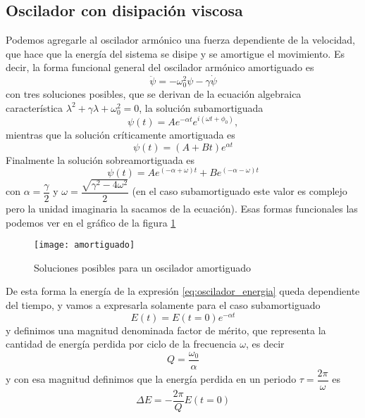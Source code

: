 \documentclass[a4paper]{article}
\numberwithin{equation}{section}
\begin{document}
    \subsection{Oscilador con disipación viscosa}
    Podemos agregarle al oscilador armónico una fuerza dependiente de la velocidad, que hace que la energía del sistema se disipe y se amortigue el movimiento. Es decir, la forma funcional general del oscilador armónico amortiguado es
    \begin{equation}
        \ddot{\psi} = - \omega_0^2 \psi - \gamma \dot{\psi}
        \label{eq:oscilador_amortiguado}
    \end{equation}
    con tres soluciones posibles, que se derivan de la ecuación algebraica característica $\lambda^2 + \gamma \lambda + \omega_0^2 = 0$, la solución subamortiguada
    \begin{equation}
        \psi(t) = A e^{-\alpha t} e^{i (\omega t + \phi_0)},
        \label{eq:oscilador_amortiguado_sub}
    \end{equation}
    mientras que la solución críticamente amortiguada es
    \begin{equation}
        \psi(t) = (A + B t) e^{\alpha t}
        \label{eq:oscilador_amortiguado_critico}
    \end{equation}
    Finalmente la solución sobreamortiguada es
    \begin{equation}
        \psi(t) = A e^{(-\alpha + \omega) t} + B e^{(-\alpha - \omega) t}
        \label{eq:oscilador_amortiguado_critico}
    \end{equation}
    con $\alpha = \dfrac{\gamma}{2}$ y $\omega = \dfrac{\sqrt{\gamma^2 - 4 \omega^2}}{2}$ (en el caso subamortiguado este valor es complejo pero la unidad imaginaria la sacamos de la ecuación). Esas formas funcionales las podemos ver en el gráfico de la figura \ref{fig:oscilador_amortiguado}
	\begin{figure}[H]
		\centering
		\texttt{[image: amortiguado]}
		\caption{Soluciones posibles para un oscilador amortiguado}
		\label{fig:oscilador_amortiguado}
	\end{figure}
    De esta forma la energía de la expresión \ref{eq:oscilador_energia} queda dependiente del tiempo, y vamos a expresarla solamente para el caso subamortiguado 
    \begin{equation}
        E(t) = E(t = 0) e^{-\alpha t}
        \label{eq:oscilador_amortiguado_energia}
    \end{equation}
    y definimos una magnitud denominada factor de mérito, que representa la cantidad de energía perdida por ciclo de la frecuencia $\omega$, es decir
    \begin{equation}
        Q = \frac{\omega_0}{\alpha}
    \end{equation}
	y con esa magnitud definimos que la energía perdida en un periodo $\tau = \dfrac{2\pi}{\omega}$ es
	\begin{equation}
		\Delta E = - \frac{2\pi}{Q} E(t=0)
	\end{equation}
\end{document}
